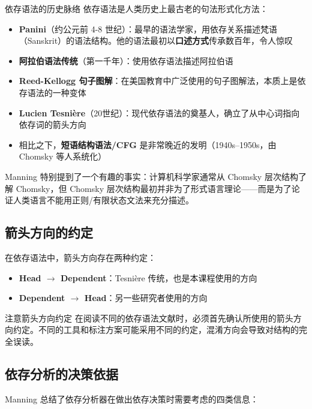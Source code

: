 \begin{knowledgebox}{依存语法的历史脉络}
依存语法是人类历史上最古老的句法形式化方法：
\begin{itemize}
    \item \textbf{Panini}（约公元前 4-8 世纪）：最早的语法学家，用依存关系描述梵语（Sanskrit）的语法结构。他的语法最初以\textbf{口述方式}传承数百年，令人惊叹
    \item \textbf{阿拉伯语法传统}（第一千年）：使用依存语法描述阿拉伯语
    \item \textbf{Reed-Kellogg 句子图解}：在美国教育中广泛使用的句子图解法，本质上是依存语法的一种变体
    \item \textbf{Lucien Tesni\`ere}（20世纪）：现代依存语法的奠基人，确立了从中心词指向依存词的箭头方向
    \item 相比之下，\textbf{短语结构语法/CFG} 是非常晚近的发明（1940s--1950s，由 Chomsky 等人系统化）
\end{itemize}
\end{knowledgebox}

Manning 特别提到了一个有趣的事实：计算机科学家通常从 Chomsky 层次结构了解 Chomsky，但 Chomsky 层次结构最初并非为了形式语言理论——而是为了论证人类语言不能用正则/有限状态文法来充分描述。

\subsection{箭头方向的约定}

在依存语法中，箭头方向存在两种约定：

\begin{itemize}
    \item \textbf{Head $\rightarrow$ Dependent}：Tesni\`ere 传统，也是本课程使用的方向
    \item \textbf{Dependent $\rightarrow$ Head}：另一些研究者使用的方向
\end{itemize}

\begin{warningbox}{注意箭头方向约定}
在阅读不同的依存语法文献时，必须首先确认所使用的箭头方向约定。不同的工具和标注方案可能采用不同的约定，混淆方向会导致对结构的完全误读。
\end{warningbox}

\subsection{依存分析的决策依据}

Manning 总结了依存分析器在做出依存决策时需要考虑的四类信息：

